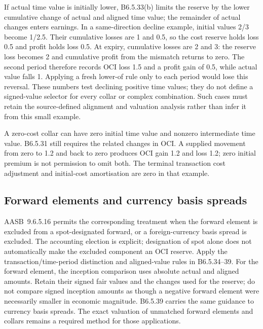 If actual time value is initially lower, B6.5.33(b) limits the reserve by the lower cumulative change of actual and aligned time value; the remainder of actual changes enters earnings. In a same-direction decline example, initial values 2/3 become 1/2.5. Their cumulative losses are 1 and 0.5, so the cost reserve holds loss 0.5 and profit holds loss 0.5. At expiry, cumulative losses are 2 and 3: the reserve loss becomes 2 and cumulative profit from the mismatch returns to zero. The second period therefore records OCI loss 1.5 and a profit gain of 0.5, while actual value falls 1. Applying a fresh lower-of rule only to each period would lose this reversal. These numbers test declining positive time values; they do not define a signed-value selector for every collar or complex combination. Such cases must retain the source-defined alignment and valuation analysis rather than infer it from this small example.

A zero-cost collar can have zero initial time value and nonzero intermediate time value. B6.5.31 still requires the related changes in OCI. A supplied movement from zero to 1.2 and back to zero produces OCI gain 1.2 and loss 1.2; zero initial premium is not permission to omit both. The terminal transaction cost adjustment and initial-cost amortisation are zero in that example.



\hypertarget{forward-elements-and-currency-basis-spreads}{%
\subsection{Forward elements and currency basis spreads}\label{forward-elements-and-currency-basis-spreads}}

AASB~9.6.5.16 \citep[6.5.16 and B6.5.34--39]{aasb9dated} permits the corresponding treatment when the forward element is excluded from a spot-designated forward, or a foreign-currency basis spread is excluded. The accounting election is explicit; designation of spot alone does not automatically make the excluded component an OCI reserve. Apply the transaction/time-period distinction and aligned-value rules in B6.5.34--39. For the forward element, the inception comparison uses absolute actual and aligned amounts. Retain their signed fair values and the changes used for the reserve; do not compare signed inception amounts as though a negative forward element were necessarily smaller in economic magnitude. B6.5.39 carries the same guidance to currency basis spreads. The exact valuation of unmatched forward elements and collars remains a required method for those applications.

